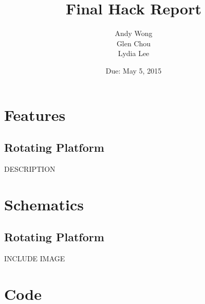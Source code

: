 \documentclass[a4paper, 11pt]{article}
\title{Final Hack Report}\author{Andy Wong\\Glen Chou\\Lydia Lee}\date{Due: May 5, 2015}
\begin{document}
\pagestyle{fancy}
\fancyhf{}
\maketitle
\tableofcontents

\newpage
\section{Features}
	\subsection{Rotating Platform}
		DESCRIPTION
	\subsection{}
\newpage
\section{Schematics}
	\subsection{Rotating Platform}
		INCLUDE IMAGE
\section{Code}
\end{document}
